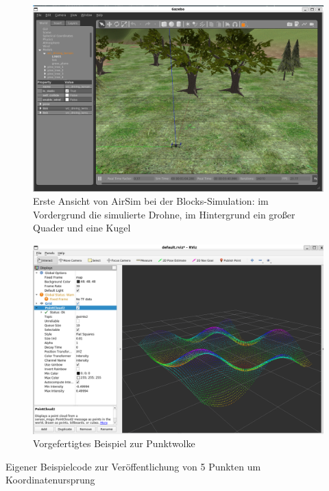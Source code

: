 \begin{figure}[!ht]
    \centering
    \includegraphics[width=\linewidth]{images/sim_gazebo.png}
    \caption[Ansicht Gazebo Simulator]{Erste Ansicht von AirSim bei der Blocks-Simulation: im Vordergrund die simulierte Drohne, im Hintergrund ein großer Quader und eine Kugel}
    \label{fig:sim_airsim}
\end{figure}

\begin{figure}[!ht]
    \centering
    \includegraphics[width=\linewidth]{images/ultra_pc_example.png}
    \caption{Vorgefertigtes Beispiel zur Punktwolke}
    \label{fig:ultra_pc_ex}
\end{figure}

\begin{listing}[!ht]
    \caption{Eigener Beispielcode zur Veröffentlichung von 5 Punkten um Koordinatenursprung}
    \label{listing:pcl_test.py}
\end{listing}

